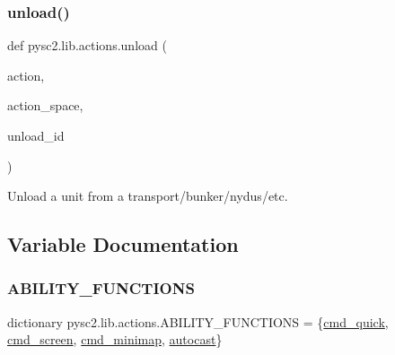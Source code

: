 \subsubsection{\texorpdfstring{unload()}{unload()}}
{\footnotesize\ttfamily def pysc2.\+lib.\+actions.\+unload (\begin{DoxyParamCaption}\item[{}]{action,  }\item[{}]{action\+\_\+space,  }\item[{}]{unload\+\_\+id }\end{DoxyParamCaption})}

\begin{DoxyVerb}Unload a unit from a transport/bunker/nydus/etc.\end{DoxyVerb}
 

\subsection{Variable Documentation}
\mbox{\label{namespacepysc2_1_1lib_1_1actions_a9760f56ed18b819f0c6a6c4e57bd83d6}} 
\subsubsection{\texorpdfstring{A\+B\+I\+L\+I\+T\+Y\+\_\+\+F\+U\+N\+C\+T\+I\+O\+NS}{ABILITY\_FUNCTIONS}}
{\footnotesize\ttfamily dictionary pysc2.\+lib.\+actions.\+A\+B\+I\+L\+I\+T\+Y\+\_\+\+F\+U\+N\+C\+T\+I\+O\+NS = \{\mbox{\hyperlink{namespacepysc2_1_1lib_1_1actions_a2129f1b3173891d9a1d311d1dda40d78}{cmd\+\_\+quick}}, \mbox{\hyperlink{namespacepysc2_1_1lib_1_1actions_a6a71ca9bf1a3ce76be66fe022c827d4a}{cmd\+\_\+screen}}, \mbox{\hyperlink{namespacepysc2_1_1lib_1_1actions_a60765a989aa093570dfcb690d81dd2d6}{cmd\+\_\+minimap}}, \mbox{\hyperlink{namespacepysc2_1_1lib_1_1actions_a30a09b1c2a0e2eb0799bb453dcc00842}{autocast}}\}}

\mbox{\label{namespacepysc2_1_1lib_1_1actions_a1a530662a2ee381a88e0f1f3f0667d53}} 
